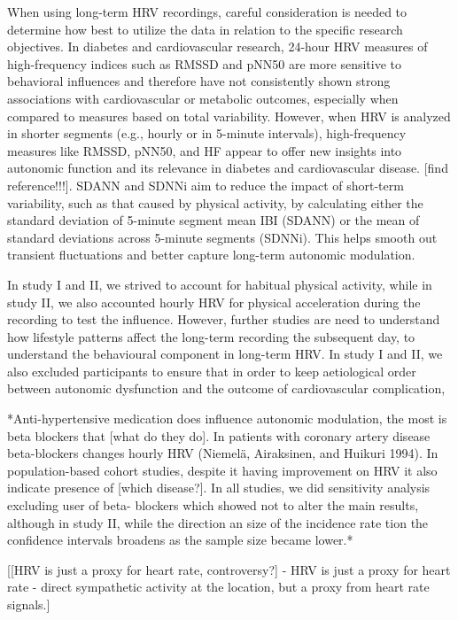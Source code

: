 \documentclass[
  a4paper,
  headsepline=true,
  open=any]{scrbook}
\begin{document}
When using long-term HRV recordings, careful consideration is needed to
determine how best to utilize the data in relation to the specific
research objectives. In diabetes and cardiovascular research, 24-hour
HRV measures of high-frequency indices such as RMSSD and pNN50 are more
sensitive to behavioral influences and therefore have not consistently
shown strong associations with cardiovascular or metabolic outcomes,
especially when compared to measures based on total variability.
However, when HRV is analyzed in shorter segments (e.g., hourly or in
5-minute intervals), high-frequency measures like RMSSD, pNN50, and HF
appear to offer new insights into autonomic function and its relevance
in diabetes and cardiovascular disease. {[}find reference!!!{]}. SDANN
and SDNNi aim to reduce the impact of short-term variability, such as
that caused by physical activity, by calculating either the standard
deviation of 5-minute segment mean IBI (SDANN) or the mean of standard
deviations across 5-minute segments (SDNNi). This helps smooth out
transient fluctuations and better capture long-term autonomic
modulation.

In study I and II, we strived to account for habitual physical activity,
while in study II, we also accounted hourly HRV for physical
acceleration during the recording to test the influence. However,
further studies are need to understand how lifestyle patterns affect the
long-term recording the subsequent day, to understand the behavioural
component in long-term HRV. In study I and II, we also excluded
participants to ensure that in order to keep aetiological order between
autonomic dysfunction and the outcome of cardiovascular complication,

*Anti-hypertensive medication does influence autonomic modulation, the
most is beta blockers that {[}what do they do{]}. In patients with
coronary artery disease beta-blockers changes hourly HRV (Niemelä,
Airaksinen, and Huikuri 1994). In population-based cohort studies,
despite it having improvement on HRV it also indicate presence of
{[}which disease?{]}. In all studies, we did sensitivity analysis
excluding user of beta- blockers which showed not to alter the main
results, although in study II, while the direction an size of the
incidence rate tion the confidence intervals broadens as the sample size
became lower.*

{[}{[}HRV is just a proxy for heart rate, controversy?{]} - HRV is just
a proxy for heart rate - direct sympathetic activity at the location,
but a proxy from heart rate signals.{]}
\end{document}
